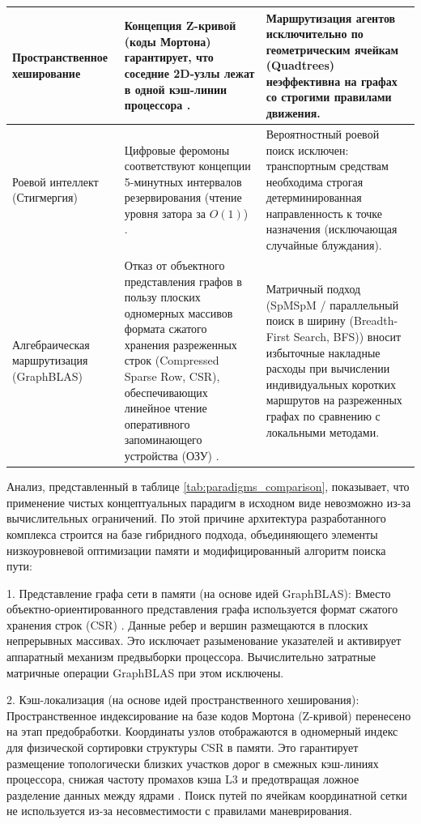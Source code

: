 \begin{table}[htbp]
\begin{tabularx}{\linewidth}{|p{3.5cm}|X|X|}
Пространственное хеширование & Концепция Z-кривой (коды Мортона) гарантирует, что соседние 2D-узлы лежат в одной кэш-линии процессора \cite{morton1966computer}. & Маршрутизация агентов исключительно по геометрическим ячейкам (Quadtrees) неэффективна на графах со строгими правилами движения. \\ \hline
Роевой интеллект (Стигмергия) & Цифровые феромоны соответствуют концепции 5-минутных интервалов резервирования (чтение уровня затора за $O(1)$) \cite{deepa2016swarm}. & Вероятностный роевой поиск исключен: транспортным средствам необходима строгая детерминированная направленность к точке назначения (исключающая случайные блуждания). \\ \hline
Алгебраическая маршрутизация (GraphBLAS) & Отказ от объектного представления графов в пользу плоских одномерных массивов формата сжатого хранения разреженных строк (Compressed Sparse Row, CSR), обеспечивающих линейное чтение оперативного запоминающего устройства (ОЗУ) \cite{buluc2017design}. & Матричный подход (SpMSpM / параллельный поиск в ширину (Breadth-First Search, BFS)) вносит избыточные накладные расходы при вычислении индивидуальных коротких маршрутов на разреженных графах по сравнению с локальными методами. \\ \hline
\end{tabularx}
\end{table}

Анализ, представленный в таблице \ref{tab:paradigms_comparison}, показывает, что применение чистых концептуальных парадигм в исходном виде невозможно из-за вычислительных ограничений. По этой причине архитектура разработанного комплекса строится на базе гибридного подхода, объединяющего элементы низкоуровневой оптимизации памяти и модифицированный алгоритм поиска пути:

1. Представление графа сети в памяти (на основе идей GraphBLAS):
Вместо объектно-ориентированного представления графа используется формат сжатого хранения строк (CSR) \cite{drepper2007memory, buluc2017design}. Данные ребер и вершин размещаются в плоских непрерывных массивах. Это исключает разыменование указателей и активирует аппаратный механизм предвыборки процессора. Вычислительно затратные матричные операции GraphBLAS при этом исключены.

2. Кэш-локализация (на основе идей пространственного хеширования):
Пространственное индексирование на базе кодов Мортона (Z-кривой) \cite{morton1966computer} перенесено на этап предобработки. Координаты узлов отображаются в одномерный индекс для физической сортировки структуры CSR в памяти. Это гарантирует размещение топологически близких участков дорог в смежных кэш-линиях процессора, снижая частоту промахов кэша L3 и предотвращая ложное разделение данных между ядрами \cite{butorin2026thread}. Поиск путей по ячейкам координатной сетки не используется из-за несовместимости с правилами маневрирования.

